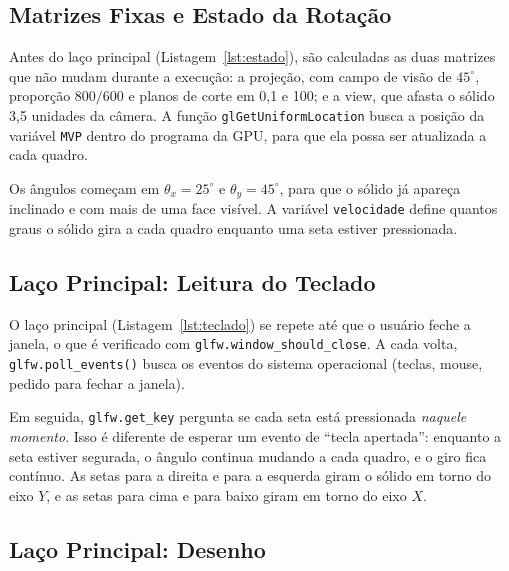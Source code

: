 \documentclass{article}
\begin{document}
\subsection{Matrizes Fixas e Estado da Rotação}

Antes do laço principal (Listagem~\ref{lst:estado}), são calculadas as duas matrizes que não mudam durante a execução: a projeção, com campo de visão de $45^\circ$, proporção $800/600$ e planos de corte em 0,1 e 100; e a view, que afasta o sólido 3,5 unidades da câmera. A função \texttt{glGetUniformLocation} busca a posição da variável \texttt{MVP} dentro do programa da GPU, para que ela possa ser atualizada a cada quadro.

Os ângulos começam em $\theta_x = 25^\circ$ e $\theta_y = 45^\circ$, para que o sólido já apareça inclinado e com mais de uma face visível. A variável \texttt{velocidade} define quantos graus o sólido gira a cada quadro enquanto uma seta estiver pressionada.



\subsection{Laço Principal: Leitura do Teclado}

O laço principal (Listagem~\ref{lst:teclado}) se repete até que o usuário feche a janela, o que é verificado com \texttt{glfw.window\_should\_close}. A cada volta, \texttt{glfw.poll\_events()} busca os eventos do sistema operacional (teclas, mouse, pedido para fechar a janela).

Em seguida, \texttt{glfw.get\_key} pergunta se cada seta está pressionada \textit{naquele momento}. Isso é diferente de esperar um evento de ``tecla apertada'': enquanto a seta estiver segurada, o ângulo continua mudando a cada quadro, e o giro fica contínuo. As setas para a direita e para a esquerda giram o sólido em torno do eixo $Y$, e as setas para cima e para baixo giram em torno do eixo $X$.



\subsection{Laço Principal: Desenho}
\end{document}
